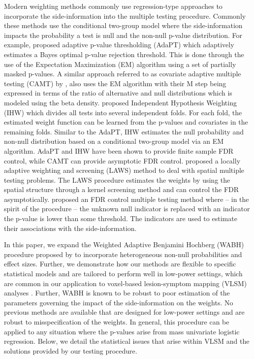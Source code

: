 \documentclass[bimj,fleqn]{w-art}
\theoremstyle{plain}
\theoremstyle{definition}
\begin{document}
  
Modern weighting methods commonly use regression-type approaches to incorporate the side-information into the multiple testing procedure. Commonly these methods use the conditional two-group model where the side-information impacts the probability a test is null and the non-null p-value distribution. For example, \cite{Lihua2018} proposed adaptive p-value thresholding (AdaPT) which adaptively estimates a Bayes optimal p-value rejection threshold. This is done through the use of the Expectation Maximization (EM) algorithm using a set of partially masked p-values. A similar approach referred to as covariate adaptive multiple testing (CAMT) by \cite{Xianyang20}, also uses the EM algorithm with their M step being expressed in terms of the ratio of alternative and null distributions which is modeled using the beta density. \cite{Ignatiadis2021} proposed Independent Hypothesis Weighting (IHW) which divides all tests into several independent folds. For each fold, the estimated weight function can be learned from the p-values and covariates in the remaining folds. Similar to the AdaPT, IHW estimates the null probability and non-null distribution based on a conditional two-group model via an EM algorithm. AdaPT and IHW have been shown to provide finite sample FDR control, while CAMT can provide asymptotic FDR control. \cite{Cai2021} proposed a locally adaptive weighting and screening (LAWS) method to deal with spatial multiple testing problems. The LAWS procedure estimates the weights by using the spatial structure through a kernel screening method and can control the FDR asymptotically. \cite{BocLee18} proposed an FDR control multiple testing method \citep[R package \texttt{swfdr}][]{swfdrpackage} where -- in the spirit of the \cite{Sto02} procedure -- the unknown null indicator is replaced with an indicator the p-value is lower than some threshold. The indicators are used to estimate their associations with the side-information. 


In this paper, we expand the Weighted Adaptive Benjamini Hochberg (WABH) procedure proposed by \cite{Habiger2017} to incorporate heterogeneous non-null probabilities and effect sizes. Further, we demonstrate how our methods are flexible to specific statistical models and are tailored to perform well in low-power settings, which are common in our application to voxel-based lesion-symptom mapping (VLSM) analyses \citep{Batetal03,Roretal07}. Further, WABH is known to be robust to poor estimation of the parameters governing the impact of the side-information on the weights. No previous methods are available that are designed for low-power settings and are robust to misspecification of the weights. In general, this procedure can be applied to any situation where the p-values arise from mass univariate logistic regression. Below, we detail the statistical issues that arise within VLSM and the solutions provided by our testing procedure. 
\end{document}
